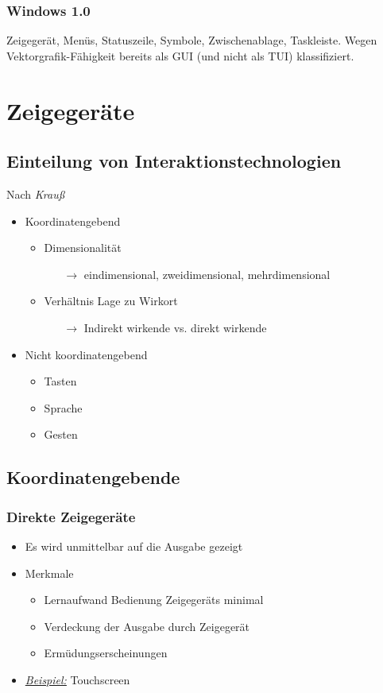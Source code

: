 \documentclass
[
	8pt,		%
	ngerman,	%
	a4paper,	%
	landscape,	%
	final		%
]{extarticle}
\newcommand{\example}{\textit{\underline{Beispiel:} }}
\begin{document}
\begin{multicols*}{4}
	\subsubsection*{Windows 1.0}
	Zeigegerät, Menüs, Statuszeile, Symbole, Zwischenablage, Taskleiste.
	Wegen Vektorgrafik-Fähigkeit bereits als GUI (und nicht als TUI)
	klassifiziert.
	\section{Zeigegeräte}
	\subsection{Einteilung von Interaktionstechnologien}
	Nach \emph{Krauß}
	\begin{itemize}[nolistsep]
		\item Koordinatengebend
		      \begin{itemize}[nolistsep]
			      \item Dimensionalität
			            \begin{itemize}[nolistsep]
				            \item[\(\rightarrow\)] eindimensional,
				                  zweidimensional, mehrdimensional
			            \end{itemize}
			      \item Verhältnis Lage zu Wirkort
			            \begin{itemize}[nolistsep]
				            \item[\(\rightarrow\)] Indirekt wirkende vs. direkt
				                  wirkende
			            \end{itemize}
		      \end{itemize}
		\item Nicht koordinatengebend
		      \begin{itemize}[nolistsep]
			      \item Tasten
			      \item Sprache
			      \item Gesten
		      \end{itemize}
	\end{itemize}
	\subsection{Koordinatengebende}
	\subsubsection{Direkte Zeigegeräte}
	\begin{itemize}
		\item Es wird unmittelbar auf die Ausgabe gezeigt
		\item Merkmale
		      \begin{itemize}[nolistsep]
			      \item Lernaufwand Bedienung Zeigegeräts minimal
			      \item Verdeckung der Ausgabe durch Zeigegerät
			      \item Ermüdungserscheinungen
		      \end{itemize}
		\item \example Touchscreen
	\end{itemize}

\end{multicols*}
\end{document}
